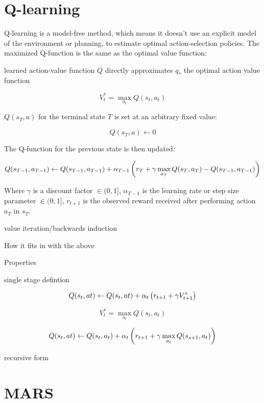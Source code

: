 \documentclass[12pt]{article}
\begin{document}


\section{Q-learning} %
\label{sec:q_learning}

Q-learning is a model-free method, which means it doesn't use an explicit model of the environment or planning, to estimate optimal action-selection policies. The maximized Q-function is the same as the optimal value function:

learned action-value function $Q$ directly approximates $q_{*}$ the optimal action value function

\[
  V^{*}_{t} = \max_{a_{t}} Q(s_{t}, a_{t})
\]

$Q(s_{T}, a)$ for the terminal state $T$ is set at an arbitrary fixed value:

\[
  Q(s_{T}, a) \gets 0
\]

The Q-function for the previous state is then updated:

\[
Q(s_{T-1}, a_{T-1}) \gets Q(s_{T-1}, a_{T-1}) + \alpha_{T-1} \del{r_{T} + \gamma  \max_{a_{T}} Q(s_{T}, a_{T}) - Q(s_{T-1}, a_{T-1})}
\]

Where $\gamma$ is a discount factor $\in (0, 1]$, $\alpha_{T-1}$ is the learning rate or step size parameter $\in (0, 1]$, $r_{t+1}$ is the observed reward received after performing action $a_{T}$ in $s_{T}$. 

value iteration/backwards induction

How it fits in with the above

Properties

single stage defintion

\[
Q(s_{t}, a{t}) \gets Q(s_{t}, a{t}) + \alpha_{t} \del{r_{t+1} + \gamma V^{*}_{t + 1}}
\]

\[
V^{*}_{t} = \max_{a_{t}} Q(s_{t}, a_{t})
\]

\[
Q(s_{t}, a{t}) \gets Q(s_{t}, a_{t}) + \alpha_{t} \del{r_{t+1} + \gamma \max_{a_{t}} Q(s_{s + 1}, a_{t})}
\]

recursive form




\section{MARS} %
\label{sec:mars}
\end{document}
